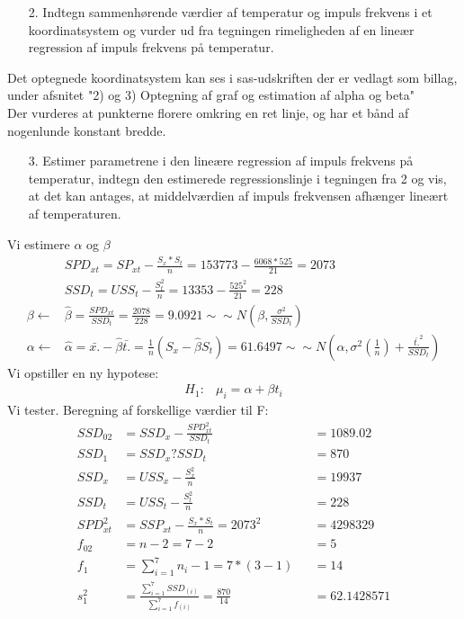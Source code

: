 \documentclass[paper=a4, fontsize=11pt]{scrartcl} %
\numberwithin{equation}{section} %
\numberwithin{figure}{section} %
\numberwithin{table}{section} %
\begin{document}
	\begin{enumerate}
		\item[2.] Indtegn sammenhørende værdier af temperatur og impuls frekvens i et koordinatsystem og vurder ud fra tegningen rimeligheden af en lineær regression af impuls frekvens på temperatur.
	\end{enumerate}
	
	Det optegnede koordinatsystem kan ses i sas-udskriften der er vedlagt som billag, under afsnitet "2) og 3) Optegning af graf og estimation af alpha og beta" \\ 
	
	Der vurderes at punkterne florere omkring en ret linje, og har et bånd af nogenlunde konstant bredde.
	
	
	\begin{enumerate}
		\item[3.] Estimer parametrene i den lineære regression af impuls frekvens på temperatur, indtegn den estimerede regressionslinje i tegningen fra 2 og vis, at det kan antages, at middelværdien af impuls frekvensen afhænger lineært af temperaturen.
	\end{enumerate}
	Vi estimere $\alpha$ og $\beta$
	\begin{align*}
	& SPD_{xt}=SP_{xt}-\frac{S_x*S_t}{n}=153773-\frac{6068*525}{21}=2073 \\
	& SSD_t=USS_t-\frac{S^2_t}{n}=13353-\frac{525^2}{21}=228 \\
	\beta \leftarrow & \hat{\beta}=\frac{SPD_{xt}}{SSD_t}=\frac{2078}{228}=9.0921\sim\sim N(\beta,\frac{\sigma^2}{SSD_t}) \\
	\alpha \leftarrow & \hat{\alpha}=\bar{x.}-\hat{\beta}\bar{t.}=\frac{1}{n}(S_x-\hat{\beta}S_t)=61.6497\sim\sim N(\alpha,\sigma^2(\frac{1}{n})+\frac{\bar{t.}^2}{SSD_t})
	\end{align*}
	Vi opstiller en ny hypotese:
	\begin{align*}
	H_1: &\mu_i=\alpha+\beta t_i
	\end{align*}
	Vi tester.
	Beregning af forskellige værdier til F:
	\begin{align*}
	SSD_{02}&=SSD_x-\frac{SPD_{xt}^2}{SSD_t}&&=1089.02 \\
	SSD_1&=SSD_x?SSD_t&&=870 \\
	SSD_x&=USS_x-\frac{S^2_x}{n}&&=19937 \\
	SSD_t&=USS_t-\frac{S_t^2}{n}&&=228 \\
	SPD_{xt}^2&=SSP_{xt}-\frac{S_x*S_t}{n}=2073^2&&=4298329 \\
	f_{02}&=n-2=7-2&&=5 \\
	f_1&=\sum_{i=1}^{7}n_i-1=7*(3-1)&&=14 \\
	s^2_1&=\frac{\sum_{i=1}^{7}SSD_{(i)}}{\sum_{i=1}^{7}f_{(i)}}=\frac{870}{14}&&=62.142857
	1
	\end{align*}
\end{document}
